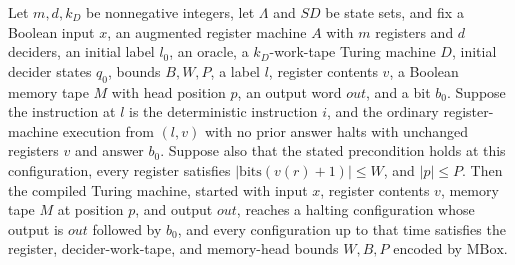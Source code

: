 \begin{theorem}
\label{Complexity.LogProg.mdet_halt}
\leanok
{}
Let $m,d,k_D$ be nonnegative integers, let $\Lambda$ and $SD$ be state sets, and fix a
Boolean input $x$, an augmented register machine $A$ with $m$ registers and $d$
deciders, an initial label $l_0$, an oracle, a $k_D$-work-tape Turing machine $D$,
initial decider states $q_0$, bounds $B,W,P$, a label $l$, register contents $v$, a
Boolean memory tape $M$ with head position $p$, an output word $out$, and a bit $b_0$.
Suppose the instruction at $l$ is the deterministic instruction $i$, and the ordinary
register-machine execution from $(l,v)$ with no prior answer halts with unchanged
registers $v$ and answer $b_0$. Suppose also that the stated precondition holds at this
configuration, every register satisfies $|\mathrm{bits}(v(r)+1)|\le W$, and $|p|\le P$.
Then the compiled Turing machine, started with input $x$, register contents $v$, memory
tape $M$ at position $p$, and output $out$, reaches a halting configuration whose output
is $out$ followed by $b_0$, and every configuration up to that time satisfies the
register, decider-work-tape, and memory-head bounds $W,B,P$ encoded by $\mathrm{MBox}$.
\end{theorem}


